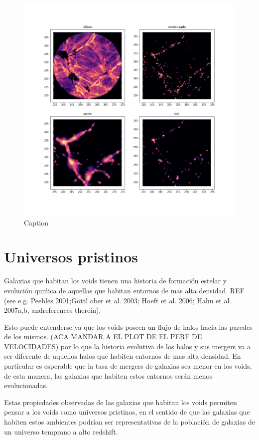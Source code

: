 \begin{figure}
    \centering
    \includegraphics[width=14cm]{Figures/FasesHexbin_S.png}
    \caption{Caption}
    \label{VoidFases}
\end{figure}{}

\section{Universos pristinos}

Galaxias que habitan los voids tienen una historia de formaci\'on estelar y evoluci\'on qu\'mica de aquellas que habitan entornos de mas alta densidad. REF  (see e.g. Peebles 2001;Gottl ̈ober et al. 2003; Hoeft et al. 2006; Hahn et al. 2007a,b, andreferences therein).

Esto puede entenderse ya que los voids poseen un flujo de halos hacia las paredes de los mismos. (ACA MANDAR A EL PLOT DE EL PERF DE VELOCIDADES) por lo que la historia evolutiva de los halos y sus mergers va a ser diferente de aquellos halos que habiten entornos de mas alta densidad. En particular es esperable que la tasa de mergers de galaxias sea menor en los voids, de esta manera, las galaxias que habiten estos entornos ser\'an menos evolucionadas. 

Estas propiedades observadas de las galaxias que habitan los voids \citep{Kreckel2016} permiten pensar a los voids como universos pristinos, en el sentido de que las galaxias que habiten estos ambientes podr\'ian ser representativas de la poblaci\'on de galaxias de un universo temprano a alto redshift. 

